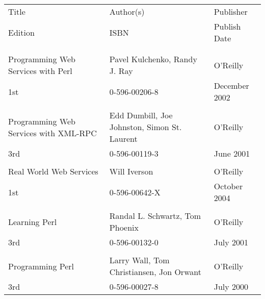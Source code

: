 \documentclass[a4paper,10pt]{article}
\begin{document}
\begin{tabular}{lll}
Title	&	Author(s)	&	Publisher	\\
Edition	&	ISBN	&	Publish Date 	\\
			&			&						\\
			&			&						\\
Programming Web Services with Perl	&	Pavel Kulchenko,  Randy J. Ray	&
O'Reilly	\\
1st&	0-596-00206-8 & December 2002	\\
			&			&						\\
Programming Web Services with XML-RPC & Edd Dumbill, Joe Johnston, Simon
St. Laurent &	O'Reilly	\\
3rd & 0-596-00119-3	&	June 2001	\\
			&			&						\\
Real World Web Services	&	Will Iverson	&	O'Reilly	\\
1st & 0-596-00642-X	&	October 2004	\\
			&			&						\\
Learning Perl	&	Randal L. Schwartz, Tom Phoenix	&	O'Reilly	\\
3rd  		&	0-596-00132-0	&	July 2001	\\
			&			&						\\
Programming Perl	&	Larry Wall, Tom Christiansen, Jon Orwant	&
O'Reilly	\\
3rd		&	0-596-00027-8	&	July 2000	\\
\end{tabular}
\end{document}
